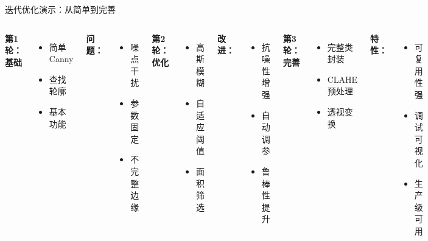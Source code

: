 \begin{frame}{迭代优化演示：从简单到完善}
	\begin{center}
	\end{center}

	\vspace{0.3cm}

	\begin{columns}
		\textbf{第1轮：基础}
		\begin{itemize}
			\item 简单 Canny
			\item 查找轮廓
			\item 基本功能
		\end{itemize}
		\textbf{问题：}
		\begin{itemize}
			\item 噪点干扰
			\item 参数固定
			\item 不完整边缘
		\end{itemize}

		\textbf{第2轮：优化}
		\begin{itemize}
			\item 高斯模糊
			\item 自适应阈值
			\item 面积筛选
		\end{itemize}
		\textbf{改进：}
		\begin{itemize}
			\item 抗噪性增强
			\item 自动调参
			\item 鲁棒性提升
		\end{itemize}

		\textbf{第3轮：完善}
		\begin{itemize}
			\item 完整类封装
			\item CLAHE 预处理
			\item 透视变换
		\end{itemize}
		\textbf{特性：}
		\begin{itemize}
			\item 可复用性强
			\item 调试可视化
			\item 生产级可用
		\end{itemize}
	\end{columns}
\end{frame}

